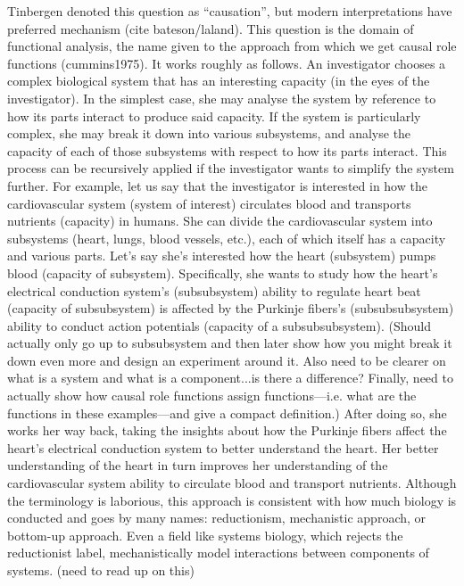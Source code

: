 \documentclass{article}
\begin{document}
Tinbergen denoted this question as ``causation'', but modern interpretations have preferred mechanism (cite bateson/laland).
This question is the domain of functional analysis, the name given to the approach from which we get causal role functions (cummins1975).
It works roughly as follows.
An investigator chooses a complex biological system that has an interesting capacity (in the eyes of the investigator).
In the simplest case, she may analyse the system by reference to how its parts interact to produce said capacity.
If the system is particularly complex, she may break it down into various subsystems, and analyse the capacity of each of those subsystems with respect to how its parts interact.
This process can be recursively applied if the investigator wants to simplify the system further.
For example, let us say that the investigator is interested in how the cardiovascular system (system of interest) circulates blood and transports nutrients (capacity) in humans.
She can divide the cardiovascular system into subsystems (heart, lungs, blood vessels, etc.), each of which itself has a capacity and various parts.
Let's say she's interested how the heart (subsystem) pumps blood (capacity of subsystem).
Specifically, she wants to study how the heart's electrical conduction system's (subsubsystem) ability to regulate heart beat (capacity of subsubsystem) is affected by the Purkinje fibers's (subsubsubsystem) ability to conduct action potentials (capacity of a subsubsubsystem). (Should actually only go up to subsubsystem and then later show how you might break it down even more and design an experiment around it. Also need to be clearer on what is a system and what is a component...is there a difference? Finally, need to actually show how causal role functions assign functions---i.e. what are the functions in these examples---and give a compact definition.)
After doing so, she works her way back, taking the insights about how the Purkinje fibers affect the heart's electrical conduction system to better understand the heart.
Her better understanding of the heart in turn improves her understanding of the cardiovascular system ability to circulate blood and transport nutrients.
Although the terminology is laborious, this approach is consistent with how much biology is conducted and goes by many names: reductionism, mechanistic approach, or bottom-up approach.
Even a field like systems biology, which rejects the reductionist label, mechanistically model interactions between components of systems. (need to read up on this)
\end{document}
